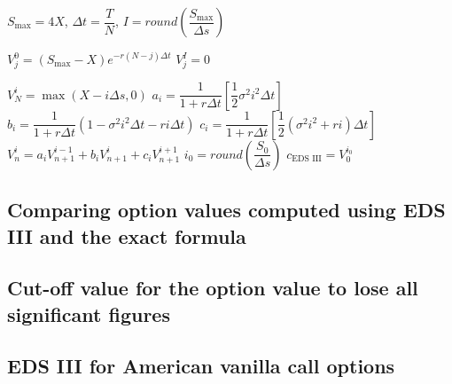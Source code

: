 \begin{algorithm}[H]
	$S_{\max} = 4X$, 
	$\Delta t = \dfrac{T}{N}$, 
	$I = round \left ( \dfrac{S_{\max}}{\Delta s} \right)$\;
	
	 {
		$V^{0}_{j} = (S_{\max} - X)e^{-r(N-j) \Delta t}$\;
		$V^{I}_{j} = 0$\;
	}
	
	 {
		$V^{i}_{N} = \max(X - i\Delta s, 0)$\;
		$a_i = \dfrac{1}{1 + r \Delta t} \left [\dfrac{1}{2} \sigma^2 i^2 \Delta t \right ]$\;
		$b_i = \dfrac{1}{1 + r \Delta t} \left (1 - \sigma^2 i^2 \Delta t - r i \Delta t \right )$\;
		$c_i = \dfrac{1}{1 + r \Delta t} \left [ \dfrac{1}{2} ( \sigma^2 i^2 + ri) \Delta t \right ]$\;
		 {
			$V_n^i = a_i V^{i - 1}_{n+1} + b_i V^i_{n+1} + c_i V^{i+1}_{n+1}$ \;
		}
	}
	$i_0 = round \left (\dfrac{S_0}{\Delta s} \right )$\;
	$c_{\text{EDS III}} = V_0^{i_0}$\;
	
\end{algorithm}


\subsection{Comparing option values computed using EDS III and the exact formula}

\subsection{Cut-off value for the option value to lose all significant figures}

\subsection{EDS III for American vanilla call options}


